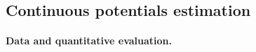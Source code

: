 
\subsection{Continuous potentials estimation}\label{sec:continuous}

\paragraph{Data and quantitative evaluation.}\label{sec:online_exp}

